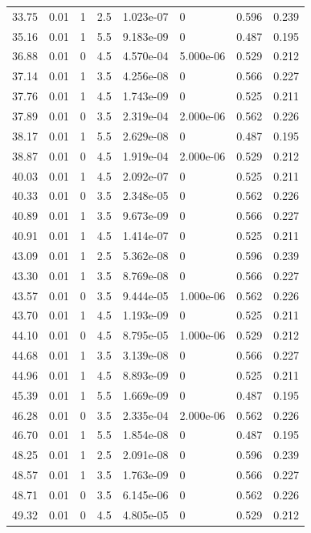 \documentclass[preview]{standalone}
\begin{document}
{{{\begin{tabular}{L{1.2cm}C{1.2cm} C{0.3cm}C{0.5cm} C{1.4cm}C{1.4cm} C{1.4cm}C{1.4cm}}
  33.75  &  0.01  & 1     & 2.5 &  1.023e-07  & 0  & 0.596 &  0.239   \\ 
  35.16  &  0.01  & 1     & 5.5 &  9.183e-09  & 0  & 0.487 &  0.195   \\ 
  36.88  &  0.01  & 0     & 4.5 &  4.570e-04  & 5.000e-06  & 0.529 &  0.212   \\ 
  37.14  &  0.01  & 1     & 3.5 &  4.256e-08  & 0  & 0.566 &  0.227   \\ 
  37.76  &  0.01  & 1     & 4.5 &  1.743e-09  & 0  & 0.525 &  0.211   \\ 
  37.89  &  0.01  & 0     & 3.5 &  2.319e-04  & 2.000e-06  & 0.562 &  0.226   \\ 
  38.17  &  0.01  & 1     & 5.5 &  2.629e-08  & 0  & 0.487 &  0.195   \\ 
  38.87  &  0.01  & 0     & 4.5 &  1.919e-04  & 2.000e-06  & 0.529 &  0.212   \\ 
  40.03  &  0.01  & 1     & 4.5 &  2.092e-07  & 0  & 0.525 &  0.211   \\ 
  40.33  &  0.01  & 0     & 3.5 &  2.348e-05  & 0  & 0.562 &  0.226   \\ 
  40.89  &  0.01  & 1     & 3.5 &  9.673e-09  & 0  & 0.566 &  0.227   \\ 
  40.91  &  0.01  & 1     & 4.5 &  1.414e-07  & 0  & 0.525 &  0.211   \\ 
  43.09  &  0.01  & 1     & 2.5 &  5.362e-08  & 0  & 0.596 &  0.239   \\ 
  43.30  &  0.01  & 1     & 3.5 &  8.769e-08  & 0  & 0.566 &  0.227   \\ 
  43.57  &  0.01  & 0     & 3.5 &  9.444e-05  & 1.000e-06  & 0.562 &  0.226   \\ 
  43.70  &  0.01  & 1     & 4.5 &  1.193e-09  & 0  & 0.525 &  0.211   \\ 
  44.10  &  0.01  & 0     & 4.5 &  8.795e-05  & 1.000e-06  & 0.529 &  0.212   \\ 
  44.68  &  0.01  & 1     & 3.5 &  3.139e-08  & 0  & 0.566 &  0.227   \\ 
  44.96  &  0.01  & 1     & 4.5 &  8.893e-09  & 0  & 0.525 &  0.211   \\ 
  45.39  &  0.01  & 1     & 5.5 &  1.669e-09  & 0  & 0.487 &  0.195   \\ 
  46.28  &  0.01  & 0     & 3.5 &  2.335e-04  & 2.000e-06  & 0.562 &  0.226   \\ 
  46.70  &  0.01  & 1     & 5.5 &  1.854e-08  & 0  & 0.487 &  0.195   \\ 
  48.25  &  0.01  & 1     & 2.5 &  2.091e-08  & 0  & 0.596 &  0.239   \\ 
  48.57  &  0.01  & 1     & 3.5 &  1.763e-09  & 0  & 0.566 &  0.227   \\ 
  48.71  &  0.01  & 0     & 3.5 &  6.145e-06  & 0  & 0.562 &  0.226   \\ 
  49.32  &  0.01  & 0     & 4.5 &  4.805e-05  & 0  & 0.529 &  0.212   \\ 
\hline 
\end{tabular} 

}}}
\end{document}
